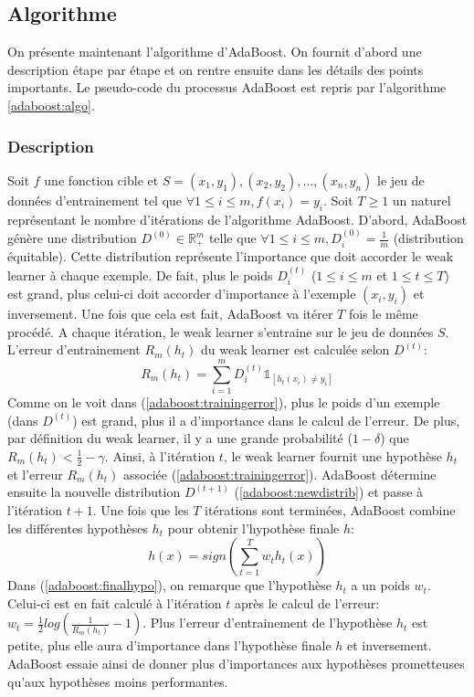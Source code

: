 \documentclass[12pt]{article}
\begin{document}
	\subsection{Algorithme}
	
	On présente maintenant l'algorithme d'AdaBoost. On fournit d'abord une description étape par étape et on rentre ensuite dans les détails des points importants. Le pseudo-code du processus AdaBoost est repris par l'algorithme \ref{adaboost:algo}.
	
	\subsubsection{Description}
	
	Soit $f$ une fonction cible et $S=(x_1,y_1),(x_2,y_2),...,(x_n,y_n)$ le jeu de données d'entrainement tel que $\forall 1 \leq i \leq m, f(x_i) = y_i$. Soit $T \geq 1$ un naturel représentant le nombre d'itérations de l'algorithme AdaBoost. D'abord, AdaBoost génère une distribution $D^{(0)} \in \mathbb{R}^m_+$ telle que $\forall 1 \leq i \leq m, D^{(0)}_i = \frac{1}{m}$ (distribution équitable). Cette distribution représente l'importance que doit accorder le weak learner à chaque exemple. De fait, plus le poids $D^{(t)}_i$ ($1 \leq i \leq m$ et $1 \leq t \leq T$) est grand, plus celui-ci doit accorder d'importance à l'exemple $(x_i,y_i)$ et inversement. Une fois que cela est fait, AdaBoost va itérer $T$ fois le même procédé. A chaque itération, le weak learner s'entraine sur le jeu de données $S$. L'erreur d'entrainement $R_m(h_t)$ du weak learner est calculée selon $D^{(t)}$:
	\begin{equation}
		\label{adaboost:trainingerror}
		R_m(h_t) = \sum_{i=1}^m D^{(t)}_i \mathbb{1}_{[h_t(x_i) \neq y_i]}
	\end{equation}
	Comme on le voit dans (\ref{adaboost:trainingerror}), plus le poids d'un exemple (dans $D^{(t)}$) est grand, plus il a d'importance dans le calcul de l'erreur. De plus, par définition du weak learner, il y a une grande probabilité ($1- \delta$) que $R_m(h_t)< \frac{1}{2} - \gamma$. Ainsi, à l'itération $t$, le weak learner fournit une hypothèse $h_t$ et l'erreur $R_m(h_t)$ associée (\ref{adaboost:trainingerror}). AdaBoost détermine ensuite la nouvelle distribution $D^{(t+1)}$ (\ref{adaboost:newdistrib}) et passe à l'itération $t+1$. Une fois que les $T$ itérations sont terminées, AdaBoost combine les différentes hypothèses $h_t$ pour obtenir l'hypothèse finale $h$:
	\begin{equation}
		\label{adaboost:finalhypo}
		h(x) = sign (\sum_{t=1}^T w_t h_t(x))
	\end{equation}
	Dans (\ref{adaboost:finalhypo}), on remarque que l'hypothèse $h_t$ a un poids $w_t$. Celui-ci est en fait calculé à l'itération $t$ après le calcul de l'erreur: $w_t = \frac{1}{2} log(\frac{1}{R_m(h_t)} - 1)$. Plus l'erreur d'entrainement de l'hypothèse $h_t$ est petite, plus elle aura d'importance dans l'hypothèse finale $h$ et inversement. AdaBoost essaie ainsi de donner plus d'importances aux hypothèses prometteuses qu'aux hypothèses moins performantes.
	
\end{document}
